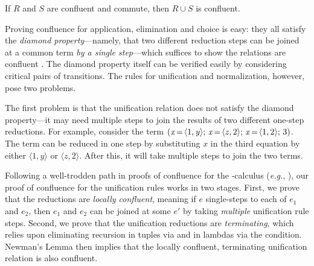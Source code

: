\documentclass[acmsmall]{acmart}
\newcommand{\Varid}[1]{\mathit{#1}}
\newcommand{\eg}{\emph{e.g.}\xspace}
\begin{document}
\begin{lemma}[Commutativity] \label{lem:comm-summary}
If $R$ and $S$ are confluent and commute, then $R \cup S$ is confluent.
\end{lemma}
\noindent
%
Proving confluence for application, elimination and choice is easy:
%
they all satisfy the \emph{diamond property}---namely, that two
different reduction steps can be joined at a common term
\emph{by a single step}---which suffices to show the
relations are confluent \cite{Barendregt}.
%
The diamond property itself can be verified easily by considering
critical pairs of transitions.
%
The rules for unification and normalization, however, pose two problems.
%

%
The first problem is that the unification relation does not satisfy the diamond property---it may need
multiple steps to join the results of two different one-step reductions.
%
For example, consider the term $\ensuremath{(\Varid{x}\hspace{-0.14em}=\hspace{-0.14em}\langle\mathrm{1},\Varid{y}\rangle;\,\Varid{x}\hspace{-0.14em}=\hspace{-0.14em}\langle\Varid{z},\mathrm{2}\rangle;\,\Varid{x}\hspace{-0.14em}=\hspace{-0.14em}\langle\mathrm{1},\mathrm{2}\rangle;\,\mathrm{3})}$.
%
The term can be reduced in one step by substituting \ensuremath{\Varid{x}}
in the third equation by either \ensuremath{\langle\mathrm{1},\Varid{y}\rangle} or \ensuremath{\langle\Varid{z},\mathrm{2}\rangle}.
After this, it will take multiple steps to join the two terms.

Following a well-trodden path in proofs of confluence
for the \textlambda-calculus (\eg, \cite{Barendregt}),
our proof of confluence for the unification rules works in two stages.
%
First, we prove that the reductions are \emph{locally confluent},
meaning if $e$ single-steps to each of $e_1$ and $e_2$, then $e_1$
and $e_2$ can be joined at some $e'$ by taking \emph{multiple}
unification rule steps.
%
Second, we prove that the unification reductions are \emph{terminating}, which relies
upon eliminating recursion in tuples via  and in lambdas
via the \noHYPHENrecursion condition.
%
Newman's Lemma \cite[Lemma 2.4]{Huet80} then implies that the
locally confluent, terminating unification relation is
also confluent.
\end{document}
